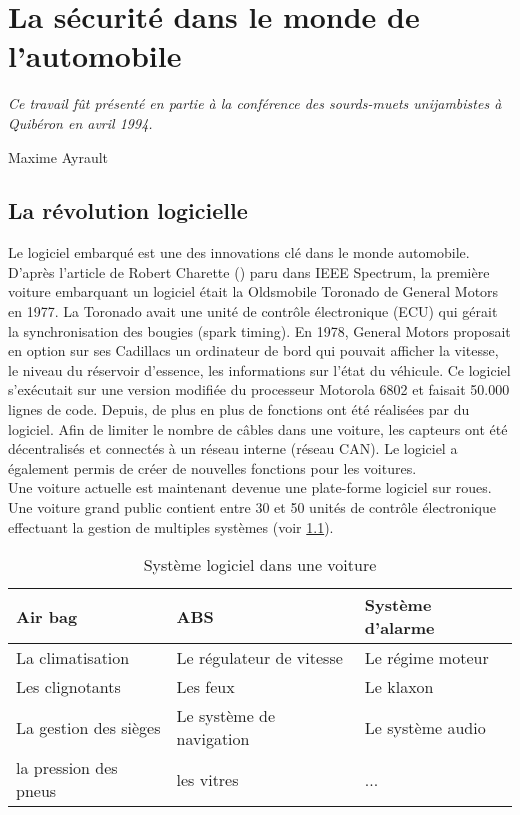 
\chapter{La s\'ecurit\'e dans le monde de l'automobile} \label{CHAP2}
\smallskip
\hfill
\begin{minipage}[b]{8cm}
{\it Ce travail f\^ut pr\'esent\'e en partie \`a la conf\'erence des sourds-muets unijambistes \`a Quib\'eron en avril 1994.}
\end{minipage}
\begin{flushright} Maxime Ayrault \end{flushright}
\vskip 2cm

\section {La r\'evolution logicielle}
\medskip
{\Huge L}e logiciel embarqu\'e est une des innovations cl\'e dans le monde automobile.
D'apr\`es l'article de Robert Charette (\cite{Cha09}) paru dans IEEE Spectrum, la premi\`ere voiture embarquant un logiciel \'etait la Oldsmobile Toronado de General Motors en 1977. La Toronado avait une unit\'e de contr\^ole \'electronique (ECU) qui g\'erait la synchronisation des bougies (spark timing). En 1978, General Motors proposait en option sur ses Cadillacs un ordinateur de bord qui pouvait afficher la vitesse, le niveau du r\'eservoir d'essence, les informations sur l'\'etat du v\'ehicule. Ce logiciel s'ex\'ecutait sur une version modifi\'ee du processeur Motorola 6802 et faisait 50.000 lignes de code. Depuis, de plus en plus de fonctions ont \'et\'e r\'ealis\'ees par du logiciel. Afin de limiter le nombre de c\^ables dans une voiture, les capteurs ont \'et\'e d\'ecentralis\'es et connect\'es \`a un r\'eseau interne (r\'eseau CAN). Le logiciel a \'egalement permis de cr\'eer de nouvelles fonctions pour les voitures. \\
Une voiture actuelle est maintenant devenue une plate-forme logiciel sur roues. Une voiture grand public contient entre 30 et 50 unit\'es de contr\^ole \'electronique effectuant la gestion de multiples syst\`emes (voir \ref{tab:soft}).

\FloatBarrier
\begin{table}
\centering
\begin{tabular}{| l | l | l |}
\hline
Air bag & ABS & Syst\`eme d'alarme \\
\hline
La climatisation & Le r\'egulateur de vitesse & Le r\'egime moteur \\
\hline
Les clignotants & Les feux & Le klaxon \\
\hline
La gestion des si\`eges & Le syst\`eme de navigation & Le syst\`eme audio \\
\hline
la pression des pneus & les vitres & ... \\
\hline
\end{tabular}
\caption{Syst\`eme logiciel dans une voiture}
\label{tab:soft}
\end{table}
\FloatBarrier


